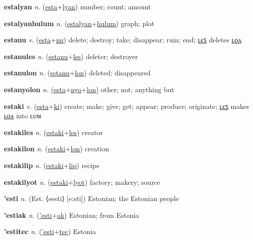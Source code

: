 \textbf{\hypertarget{estalyan}{estalyan}} \textit{n.} (\hyperlink{esta}{esta}+\allowbreak \hyperlink{lyan}{lyan})
number; count; amount

\textbf{\hypertarget{estalyanhulum}{estalyanhulum}} \textit{n.} (\hyperlink{estalyan}{estalyan}+\allowbreak \hyperlink{hulum}{hulum})
graph; plot

\textbf{\hypertarget{estanu}{estanu}} \textit{v.} (\hyperlink{esta}{esta}+\allowbreak \hyperlink{nu}{nu})
delete; destroy; take; disappear; ruin; end; \hyperlink{estanules}{ʟєꜱ} deletes \hyperlink{estanulon}{ʟᴏᴧ}

\textbf{\hypertarget{estanules}{estanules}} \textit{n.} (\hyperlink{estanu}{estanu}+\allowbreak \hyperlink{les}{les})
deleter; destroyer

\textbf{\hypertarget{estanulon}{estanulon}} \textit{n.} (\hyperlink{estanu}{estanu}+\allowbreak \hyperlink{lon}{lon})
deleted; disappeared

\textbf{\hypertarget{estanyolon}{estanyolon}} \textit{n.} (\hyperlink{esta}{esta}+\allowbreak \hyperlink{nyo}{nyo}+\allowbreak \hyperlink{lon}{lon})
other; not; anything but

\textbf{\hypertarget{estaki}{estaki}} \textit{v.} (\hyperlink{esta}{esta}+\allowbreak \hyperlink{ki}{ki})
create; make; give; get; appear; produce; originate; \hyperlink{estakiles}{ʟєꜱ} makes \hyperlink{estakilon}{ʟᴏᴧ} into ʟᴜᴍ

\textbf{\hypertarget{estakiles}{estakiles}} \textit{n.} (\hyperlink{estaki}{estaki}+\allowbreak \hyperlink{les}{les})
creator

\textbf{\hypertarget{estakilon}{estakilon}} \textit{n.} (\hyperlink{estaki}{estaki}+\allowbreak \hyperlink{lon}{lon})
creation

\textbf{\hypertarget{estakilip}{estakilip}} \textit{n.} (\hyperlink{estaki}{estaki}+\allowbreak \hyperlink{lip}{lip})
recipe

\textbf{\hypertarget{estakilyot}{estakilyot}} \textit{n.} (\hyperlink{estaki}{estaki}+\allowbreak \hyperlink{lyot}{lyot})
factory; makery; source

\textbf{\hypertarget{'esti}{'esti}} \textit{n.} (Est. ⟨eesti⟩ [eːsti])
Estonian; the Estonian people

\textbf{\hypertarget{'estiak}{'estiak}} \textit{n.} (\hyperlink{'esti}{'esti}+\allowbreak \hyperlink{ak}{ak})
Estonian; from Estonia

\textbf{\hypertarget{'estitec}{'estitec}} \textit{n.} (\hyperlink{'esti}{'esti}+\allowbreak \hyperlink{tec}{tec})
Estonia

